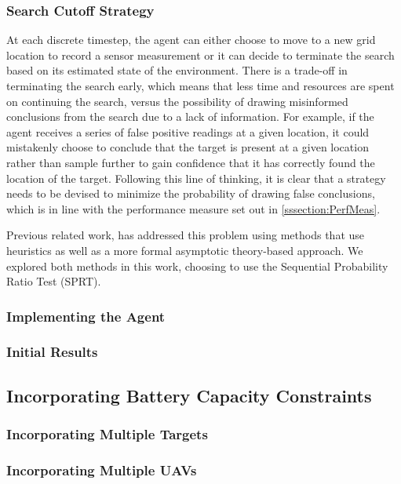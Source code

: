 \subsubsection{Search Cutoff Strategy}
\workinprogress
At each discrete timestep, the agent can either choose to move to a new grid location to record a sensor measurement or it can decide to terminate the search based on its estimated state of the environment. There is a trade-off in terminating the search early, which means that less time and resources are spent on continuing the search, versus the possibility of drawing misinformed conclusions from the search due to a lack of information. For example, if the agent receives a series of false positive readings at a given location, it could mistakenly choose to conclude that the target is present at a given location rather than sample further to gain confidence that it has correctly found the location of the target. Following this line of thinking, it is clear that a strategy needs to be devised to minimize the probability of drawing false conclusions, which is in line with the performance measure set out in \ref{sssection:PerfMeas}.\par
Previous related work, \cite{Chung2007ASearchb} has addressed this problem using methods that use heuristics as well as a more formal asymptotic theory-based approach. We explored both methods in this work, choosing to use the Sequential Probability Ratio Test (SPRT). 

\subsubsection{Implementing the Agent}
\placeholder

\subsubsection{Initial Results}
\placeholder

\subsection{Incorporating Battery Capacity Constraints}
\placeholder

\subsubsection{Incorporating Multiple Targets}
\placeholder

\subsubsection{Incorporating Multiple UAVs}
\placeholder



